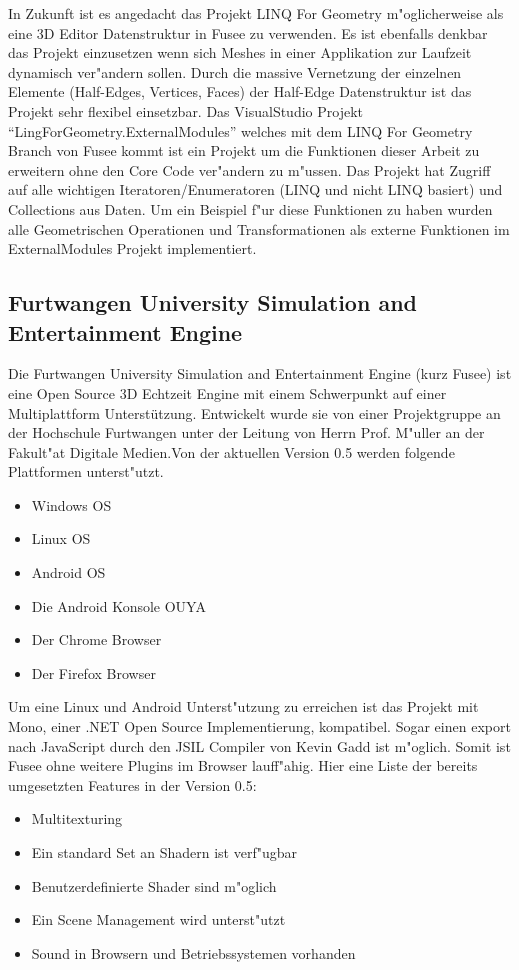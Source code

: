 \documentclass[pagesize, paper=a4, fontsize=12pt,titlepage=true, headings=small, headnosepline, abstractoff, liststotoc, nochapterprefix, plainheadsepline]{scrreprt}
\newcommand{\LFGS}{LINQ For Geometry }
\newcommand{\HES}{Half-Edge Datenstruktur }
\begin{document}
In Zukunft ist es angedacht das Projekt \LFGS m"oglicherweise als eine 3D Editor Datenstruktur in Fusee zu verwenden. Es ist ebenfalls denkbar das Projekt einzusetzen wenn sich Meshes in einer Applikation zur Laufzeit dynamisch ver"andern sollen. Durch die massive Vernetzung der einzelnen Elemente (Half-Edges, Vertices, Faces) der \HES ist das Projekt sehr flexibel einsetzbar. Das VisualStudio Projekt "`LingForGeometry.ExternalModules"' welches mit dem \LFGS Branch von Fusee kommt ist ein Projekt um die Funktionen dieser Arbeit zu erweitern ohne den Core Code ver"andern zu m"ussen. Das Projekt hat Zugriff auf alle wichtigen Iteratoren/Enumeratoren (LINQ und nicht LINQ basiert) und Collections aus Daten. Um ein Beispiel f"ur diese Funktionen zu haben wurden alle Geometrischen Operationen und Transformationen als externe Funktionen im ExternalModules Projekt implementiert.
		\subsection {Furtwangen University Simulation and Entertainment Engine}\label{sec:fusee}
			Die Furtwangen University Simulation and Entertainment Engine (kurz Fusee) ist eine Open Source 3D Echtzeit Engine mit einem Schwerpunkt auf einer Multiplattform Unterstützung. Entwickelt wurde sie von einer Projektgruppe an der Hochschule Furtwangen unter der Leitung von Herrn Prof. M"uller an der Fakult"at Digitale Medien.Von der aktuellen Version 0.5 werden folgende Plattformen unterst"utzt.
\begin{itemize}
\item Windows OS
\item Linux OS
\item Android OS
\item Die Android Konsole OUYA
\item Der Chrome Browser
\item Der Firefox Browser
\end{itemize}

Um eine Linux und Android Unterst"utzung zu erreichen ist das Projekt mit Mono, einer .NET Open Source Implementierung, kompatibel. Sogar einen export nach JavaScript durch den JSIL Compiler von Kevin Gadd ist m"oglich. Somit ist Fusee ohne weitere Plugins im Browser lauff"ahig.
\newpage
Hier eine Liste der bereits umgesetzten Features in der Version 0.5:
\begin{itemize}
\item Multitexturing
\item Ein standard Set an Shadern ist verf"ugbar
\item Benutzerdefinierte Shader sind m"oglich
\item Ein Scene Management wird unterst"utzt
\item Sound in Browsern und Betriebssystemen vorhanden
\end{itemize}
\end{document}
